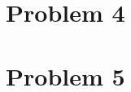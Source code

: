 \documentclass[12pt]{article}
\newcommand{\om}[0] { \omega }
\newcommand{\Om}[0] { \Omega }
\newcommand{ \cf }[1] { \mathbf{1}_{#1} }
\begin{document}
\section*{Problem 4}


\section*{Problem 5}




\end{document}
